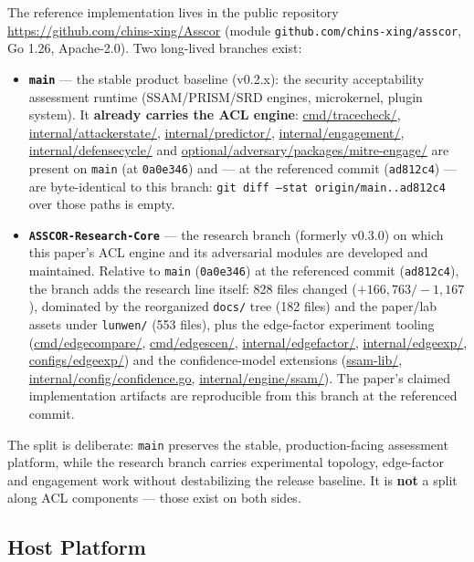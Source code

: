 \documentclass[preprints,article,accept,oneauthor]{Definitions/mdpi}
\begin{document}
The reference implementation lives in the public repository
\url{https://github.com/chins-xing/Asscor} (module
\texttt{github.com/chins-xing/asscor}, Go 1.26, Apache-2.0). Two long-lived
branches exist:
\begin{itemize}
\item \textbf{\texttt{main}} --- the stable product baseline (v0.2.x): the
      security acceptability assessment runtime (SSAM/PRISM/SRD engines,
      microkernel, plugin system). It \textbf{already carries the ACL
      engine}: \url{cmd/tracecheck/},
      \url{internal/attackerstate/}, \url{internal/predictor/},
      \url{internal/engagement/}, \url{internal/defensecycle/}
      and \url{optional/adversary/packages/mitre-engage/} are present on
      \texttt{main} (at \texttt{0a0e346}) and --- at the referenced commit
      (\texttt{ad812c4}) --- are byte-identical to this branch:
      \texttt{git diff --stat origin/main..ad812c4} over those paths is
      empty.
\item \textbf{\texttt{ASSCOR-Research-Core}} --- the research branch
      (formerly v0.3.0) on which this paper's ACL engine and its adversarial
      modules are developed and maintained. Relative to \texttt{main}
      (\texttt{0a0e346}) at the referenced commit (\texttt{ad812c4}), the
      branch adds the research line itself: 828 files changed
      ($+166{,}763/-1{,}167$), dominated by the reorganized \texttt{docs/}
      tree (182 files) and the paper/lab assets under \texttt{lunwen/} (553
      files), plus the edge-factor experiment tooling
      (\url{cmd/edgecompare/}, \url{cmd/edgescen/},
      \url{internal/edgefactor/}, \url{internal/edgeexp/},
      \url{configs/edgeexp/}) and the confidence-model extensions
      (\url{ssam-lib/}, \url{internal/config/confidence.go},
      \url{internal/engine/ssam/}). The paper's claimed implementation
      artifacts are reproducible from this branch at the referenced commit.
\end{itemize}
The split is deliberate: \texttt{main} preserves the stable, production-facing
assessment platform, while the research branch carries experimental topology,
edge-factor and engagement work without destabilizing the release baseline. It
is \textbf{not} a split along ACL components --- those exist on both sides.

\subsection{Host Platform}
\end{document}
